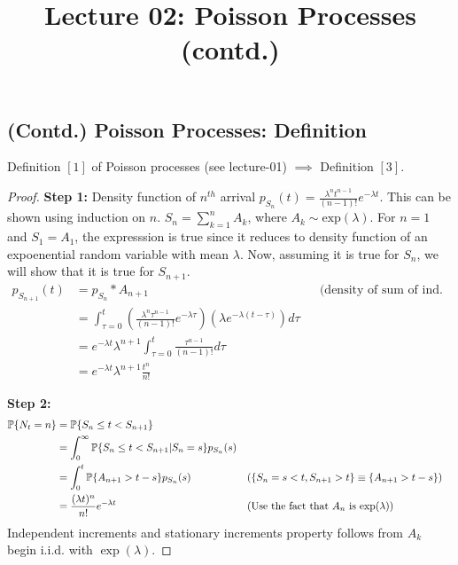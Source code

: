 \documentclass[all-lectures.tex]{subfiles}
\title{Lecture 02: Poisson Processes (contd.)}
\author{}
\begin{document}
\setcounter{chapter}{1}
\setcounter{section}{2}

\section*{}
\setcounter{subsection}{0}
\subsection{(Contd.) Poisson Processes: Definition}
\begin{prop}[]
Definition $[1]$ of Poisson processes (see lecture-01) $\implies$ Definition $[3]$.
\begin{proof} 
\textbf{Step 1:} Density function of $n^{th}$ arrival $p_{S_n}(t) = \frac{\lambda^n t^{n-1}}{(n-1)!} e^{-\lambda t}$. This can be shown using induction on $n$. $S_n = \sum_{k=1}^n A_k$, where $A_k \sim \mathrm{exp}(\lambda)$. For $n=1$ and $S_1 = A_1$, the expresssion is true since it reduces to density function of an expoenential random variable with mean $\lambda$. Now, assuming it is true for $S_n$, we will show that it is true for $S_{n+1}$.
\begin{align*}
p_{S_{n+1}}(t) &= p_{S_n} * A_{n+1} && \text{(density of sum of ind. r.v.s is their convolution)} \\
&= \int_{\tau = 0}^{t} \left(\frac{\lambda^n \tau^{n-1}}{(n-1)!} e^{-\lambda \tau} \right) \left( \lambda e^{ - \lambda (t-\tau)} \right) d\tau \\
&=  e^{-\lambda t} \lambda^{n+1}  \int_{\tau = 0}^{t} \frac{\tau^{n-1}}{(n-1)!} d\tau \\
&=  e^{-\lambda t} \lambda^{n+1}  \frac{t^n}{n!}
\end{align*}

\textbf{Step 2:} 
\begin{align*}
\P\{N_t = n\} &= \P\{S_n \leq t < S_{n+1} \} \\
 &= \int_0^\infty \P\{S_n \leq t < S_{n+1} |S_n = s\} p_{S_n}(s) \\
 &= \int_0^t \P\{A_{n+1} > t-s\} p_{S_n}(s) &&\text{($\{S_n =  s<t, S_{n+1} > t\} \equiv \{A_{n+1} > t-s\}$)}\\
 &= 	\frac{(\lambda t)^n}{n!} e^{-\lambda t} &&\text{(Use the fact  that $A_n$ is $\mathrm{exp}(\lambda$))} \qedhere
\end{align*}
Independent increments and stationary increments property follows from $A_k$ begin i.i.d. with $\exp(\lambda)$.
\end{proof}
\end{prop}
\end{document}
